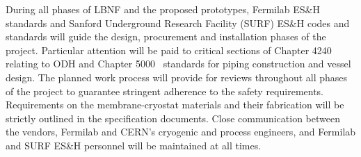 During all phases of LBNF and the proposed prototypes, 
Fermilab ES\&H standards and Sanford Underground Research 
Facility (SURF) ES\&H codes and standards will guide the design, 
procurement and installation phases of the project. Particular 
attention will be paid to critical sections of
Chapter 4240~\cite{feshm} relating to ODH and 
Chapter 5000~\cite{feshm} standards for 
piping construction and vessel design. The planned 
work process will provide for reviews throughout all 
phases of the project to guarantee stringent adherence 
to the safety requirements. Requirements on the membrane-cryostat
materials and their fabrication will be strictly outlined in the 
specification documents. Close communication between the vendors, 
Fermilab and CERN's cryogenic and process engineers, and Fermilab and 
SURF ES\&H personnel will be maintained at all times.

